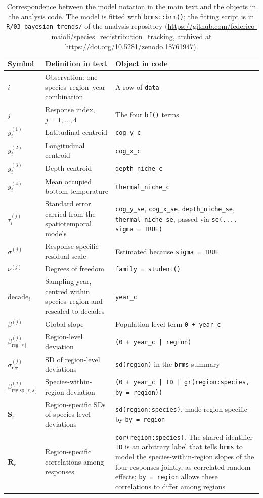 \documentclass[9pt,twoside,lineno]{pnas-new}
\begin{document}
\begin{table}[t!]
\centering
\caption{Correspondence between the model notation in the main text and the objects in the analysis code. The model is fitted with \texttt{brms::brm()}; the fitting script is in \texttt{R/03\_bayesian\_trends/} of the analysis repository (\url{https://github.com/federico-maioli/species_redistribution_tracking}, archived at \url{https://doi.org/10.5281/zenodo.18761947}).}
\label{table:code_mapping}
\renewcommand{\arraystretch}{1.4}
\begin{tabular*}{\textwidth}{@{\extracolsep{\fill}}p{2.4cm}p{5.6cm}p{6.4cm}@{}}
\toprule
Symbol & Definition in text & Object in code \\
\midrule
$i$ & Observation: one species--region--year combination & A row of \texttt{data} \\
$j$ & Response index, $j = 1,\dots,4$ & The four \texttt{bf()} terms \\
$y^{(1)}_i$ & Latitudinal centroid & \texttt{cog\_y\_c} \\
$y^{(2)}_i$ & Longitudinal centroid & \texttt{cog\_x\_c} \\
$y^{(3)}_i$ & Depth centroid & \texttt{depth\_niche\_c} \\
$y^{(4)}_i$ & Mean occupied bottom temperature & \texttt{thermal\_niche\_c} \\
$\tau^{(j)}_i$ & Standard error carried from the spatiotemporal models & \texttt{cog\_y\_se}, \texttt{cog\_x\_se}, \texttt{depth\_niche\_se}, \texttt{thermal\_niche\_se}, passed via \texttt{se(..., sigma = TRUE)} \\
$\sigma^{(j)}$ & Response-specific residual scale & Estimated because \texttt{sigma = TRUE} \\
$\nu^{(j)}$ & Degrees of freedom & \texttt{family = student()} \\
$\mathrm{decade}_i$ & Sampling year, centred within species--region and rescaled to decades & \texttt{year\_c} \\
$\beta^{(j)}$ & Global slope & Population-level term \texttt{0 + year\_c} \\
$\beta^{(j)}_{\text{reg}[r]}$ & Region-level deviation & \texttt{(0 + year\_c | region)} \\
$\sigma^{(j)}_{\text{reg}}$ & SD of region-level deviations & \texttt{sd(region)} in the \texttt{brms} summary \\
$\beta^{(j)}_{\text{reg:sp}[r,s]}$ & Species-within-region deviation & \texttt{(0 + year\_c | ID | gr(region:species, by = region))} \\
$\mathbf{S}_r$ & Region-specific SDs of species-level deviations & \texttt{sd(region:species)}, made region-specific by \texttt{by = region} \\
$\mathbf{R}_r$ & Region-specific correlations among responses & \texttt{cor(region:species)}. The shared identifier \texttt{ID} is an arbitrary label that tells \texttt{brms} to model the species-within-region slopes of the four responses jointly, as correlated random effects; \texttt{by = region} allows these correlations to differ among regions \\
\bottomrule
\end{tabular*}
\end{table}
\end{document}
